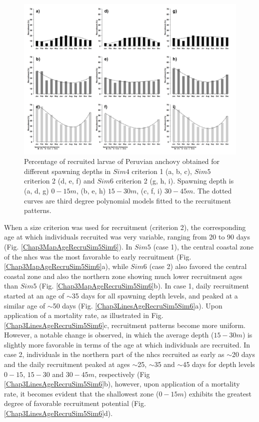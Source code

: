 \begin{figure}[H]
	\includegraphics[width=1.0\textwidth]{figures/Chap3DepthLevels.png}
	\centering
	\caption{Percentage of recruited larvae of Peruvian anchovy obtained for different spawning depths in $Sim 4$ criterion 1 (a, b, c), $Sim 5$ criterion 2 (d, e, f) and $Sim 6$ criterion 2 (g, h, i). Spawning depth is (a, d, g) $0 - 15 m$, (b, e, h) $15 - 30 m$, (c, f, i) $30 - 45 m$. The dotted curves are third degree polynomial models fitted to the recruitment patterns.}
	\label{Chap3DepthLevels}
\end{figure}

When a size criterion was used for recruitment (criterion 2), the corresponding age at which individuals recruited was very variable, ranging from 20 to 90 days (Fig. \ref{Chap3MapAgeRecruSim5Sim6}). In $Sim 5$ (case 1), the central coastal zone of the \acrshort{nhcs} was the most favorable to early recruitment (Fig. \ref{Chap3MapAgeRecruSim5Sim6}a), while $Sim 6$ (case 2) also favored the central coastal zone and also the northern zone showing much lower recruitment ages than $Sim 5$ (Fig. \ref{Chap3MapAgeRecruSim5Sim6}b). In case 1, daily recruitment started at an age of $\sim$35 days for all spawning depth levels, and peaked at a similar age of $\sim$50 days (Fig. \ref{Chap3LinesAgeRecruSim5Sim6}a). Upon application of a mortality rate, as illustrated in Fig. \ref{Chap3LinesAgeRecruSim5Sim6}c, recruitment patterns become more uniform. However, a notable change is observed, in which the average depth ($15-30 m$) is slightly more favorable in terms of the age at which individuals are recruited. In case 2, individuals in the northern part of the \acrshort{nhcs} recruited as early as $\sim$20 days and the daily recruitment peaked at ages $\sim$25, $\sim$35 and $\sim$45 days for depth levels $0 - 15$, $15 - 30$ and $30 - 45 m$, respectively (Fig \ref{Chap3LinesAgeRecruSim5Sim6}b), however, upon application of a mortality rate, it becomes evident that the shallowest zone ($0-15m$) exhibits the greatest degree of favorable recruitment potential (Fig. \ref{Chap3LinesAgeRecruSim5Sim6}d).\\

